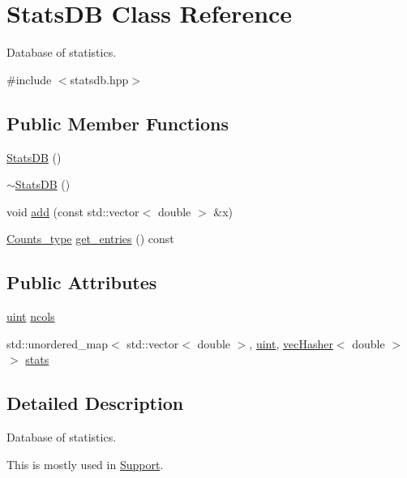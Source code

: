 \hypertarget{class_stats_d_b}{}\section{Stats\+DB Class Reference}
\label{class_stats_d_b}


Database of statistics.  




{\ttfamily \#include $<$statsdb.\+hpp$>$}

\subsection*{Public Member Functions}
\begin{DoxyCompactItemize}
\item 
\hyperlink{class_stats_d_b_a454159e71dfe6af418dfdd8704c38c8c}{Stats\+DB} ()
\item 
\hyperlink{class_stats_d_b_ab4a9371d706b7418df5cb44e81fb5429}{$\sim$\+Stats\+DB} ()
\item 
void \hyperlink{class_stats_d_b_a5759e17b759fcafeec7601188aaa8266}{add} (const std\+::vector$<$ double $>$ \&x)
\item 
\hyperlink{typedefs_8hpp_aee40fa17c1fddb63dd1f2b1470ade95b}{Counts\+\_\+type} \hyperlink{class_stats_d_b_a8ed62f6a3939b90b3493de944c9b67fc}{get\+\_\+entries} () const
\end{DoxyCompactItemize}
\subsection*{Public Attributes}
\begin{DoxyCompactItemize}
\item 
\hyperlink{typedefs_8hpp_a91ad9478d81a7aaf2593e8d9c3d06a14}{uint} \hyperlink{class_stats_d_b_a4910142d21475182bdb326436bb59564}{ncols}
\item 
std\+::unordered\+\_\+map$<$ std\+::vector$<$ double $>$, \hyperlink{typedefs_8hpp_a91ad9478d81a7aaf2593e8d9c3d06a14}{uint}, \hyperlink{structvec_hasher}{vec\+Hasher}$<$ double $>$ $>$ \hyperlink{class_stats_d_b_a675ecc967115b14bf8693858920a4a6c}{stats}
\end{DoxyCompactItemize}


\subsection{Detailed Description}
Database of statistics. 

This is mostly used in {\ttfamily \hyperlink{class_support}{Support}}. 

